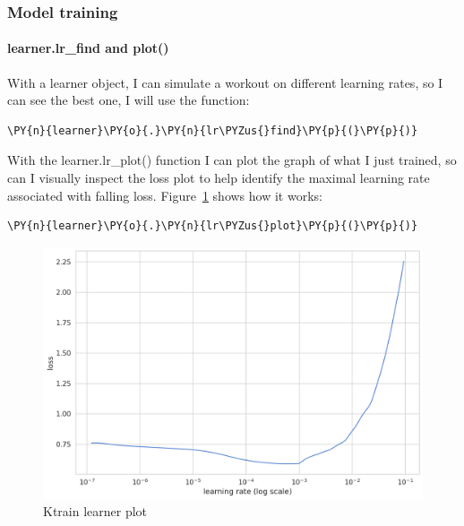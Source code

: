 \subsubsection{Model training}
\label{chap:model training}
\paragraph{learner.lr\_find and plot()}
With a learner object, I can simulate a workout on different learning rates, so I can see the best one, I will use the function:
    \begin{tcolorbox}[breakable, size=fbox, boxrule=1pt, pad at break*=1mm,colback=cellbackground, colframe=cellborder]
\begin{Verbatim}[commandchars=\\\{\},fontsize=\footnotesize]
\PY{n}{learner}\PY{o}{.}\PY{n}{lr\PYZus{}find}\PY{p}{(}\PY{p}{)}
\end{Verbatim}
\end{tcolorbox}


With the learner.lr\_plot() function I can \gls{plot} the graph of what I just trained, so can I visually inspect the loss \gls{plot} to help identify the maximal learning rate associated with falling loss.
Figure~\ref{fig:fig_08} shows how it works:
 \begin{tcolorbox}[breakable, size=fbox, boxrule=1pt, pad at break*=1mm,colback=cellbackground, colframe=cellborder]
\begin{Verbatim}[commandchars=\\\{\},fontsize=\footnotesize]
\PY{n}{learner}\PY{o}{.}\PY{n}{lr\PYZus{}plot}\PY{p}{(}\PY{p}{)}
\end{Verbatim}
\end{tcolorbox}

\begin{figure}[ht!]
\centering
\includegraphics[width=1\textwidth]{images/output_118_1.png}
\caption{\gls{Ktrain} learner plot}
\label{fig:fig_08}
\end{figure}
\FloatBarrier

